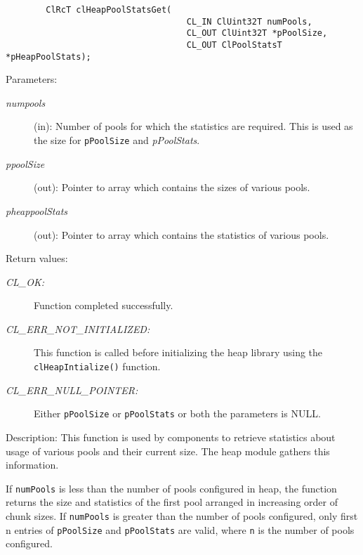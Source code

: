 \begin{flushleft}
\begin{Desc}
\footnotesize\begin{verbatim}        ClRcT clHeapPoolStatsGet(
                        			CL_IN ClUint32T numPools,
                        			CL_OUT ClUint32T *pPoolSize,
                        			CL_OUT ClPoolStatsT *pHeapPoolStats);
\end{verbatim}
\normalsize
\end{Desc}
\begin{Desc}
\item[Parameters:]
\begin{description}
\item[{\em num\-pools}](in): Number of pools for which the statistics are required. This is used as the size for {\tt{pPoolSize}} and 
\textit{pPoolStats}.
\item[{\em p\-pool\-Size}](out): Pointer to array which contains the sizes of various pools.
\item[{\em p\-heap\-pool\-Stats}](out): Pointer to array which contains the statistics of various pools.
\end{description}
\end{Desc}
\begin{Desc}
\item[Return values:]
\begin{description}
\item[{\em CL\_\-OK:}] Function completed successfully.
\item[{\em CL\_\-ERR\_\-NOT\_\-INITIALIZED:}] This function is called before initializing the heap library using the {\tt{clHeapIntialize()}} function.
\item[{\em CL\_\-ERR\_\-NULL\_\-POINTER:}] Either {\tt{pPoolSize}} or {\tt{pPoolStats}} or both the parameters is NULL.
\end{description}
\end{Desc}
\begin{Desc}
\item[Description:]
This function is used by components to retrieve statistics about usage
of various pools and their current size. 
The heap module gathers this information.
\par
If {\tt{numPools}} is less than the number of pools configured in heap, the function returns the size and statistics
of the first pool arranged in increasing order of chunk sizes. 
If {\tt{numPools}} is greater than the number of pools configured, 
only first n entries of {\tt{pPoolSize}} and {\tt{pPoolStats}} are valid, where {\tt{n}} is the number of pools configured.


\end{Desc}
\end{flushleft}
